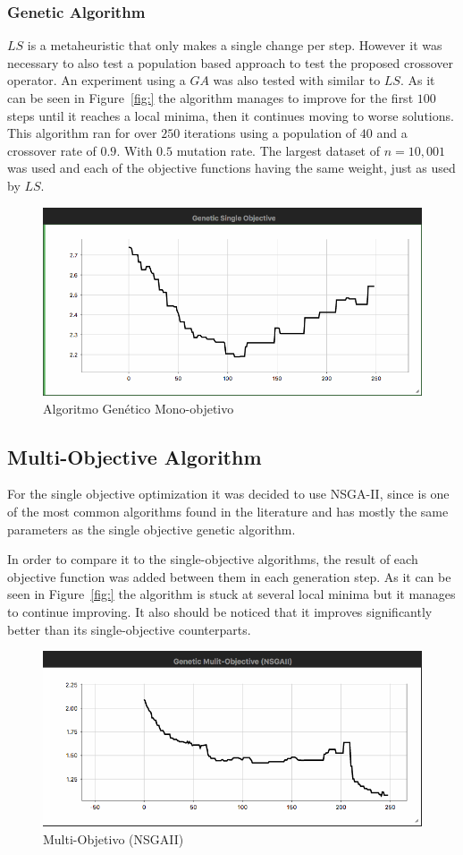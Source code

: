 \subsubsection{Genetic Algorithm}

$LS$ is a metaheuristic that only makes a single change per step. However it was necessary to also test a population based approach to test the proposed crossover operator. An experiment using a $GA$ was also tested with similar to $LS$. As it can be seen in Figure~\ref{fig:} the algorithm manages to improve for the first $100$ steps until it reaches a local minima, then it continues moving to worse solutions. This algorithm ran for over $250$ iterations using a population of $40$ and a crossover rate of $0.9$. With $0.5$ mutation rate. The largest dataset of $n=10,001$ was used and each of the objective functions having the same weight, just as used by $LS$.

\begin{figure}
    \centering
    \includegraphics[width=\textwidth]{Genetic.png}
    \caption{Algoritmo Genético Mono-objetivo}
    \label{fig:genetico}
\end{figure}

\subsection{Multi-Objective Algorithm}

For the single objective optimization it was decided to use NSGA-II, since is one of the most common algorithms found in the literature and has mostly the same parameters as the single objective genetic algorithm.

In order to compare it to the single-objective algorithms, the result of each objective function was added between them in each generation step. 
As it can be seen in Figure~\ref{fig:} the algorithm is stuck at several local minima but it manages to continue improving. It also should be noticed that it improves significantly better than its single-objective counterparts.

\begin{figure}
    \centering
    \includegraphics[width=\textwidth]{Multi-Objective.png}
    \caption{Multi-Objetivo (NSGAII)}
    \label{fig:multiobjetivo}
\end{figure}
